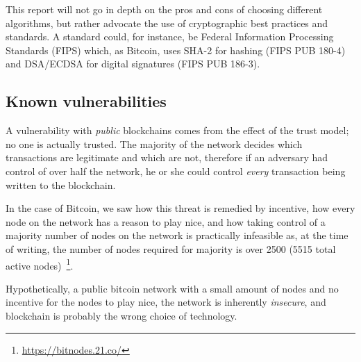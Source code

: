 This report will not go in depth on the pros and cons of choosing
different algorithms, but rather advocate the use of cryptographic
best practices and standards. A standard could, for instance, be
Federal Information Processing Standards (FIPS) which, as Bitcoin,
uses SHA-2 for hashing (FIPS PUB 180-4) and DSA/ECDSA for digital
signatures (FIPS PUB 186-3).


\subsection{Known vulnerabilities}
\label{sec:block-vuln}
A vulnerability with \textit{public} blockchains comes from the effect
of the trust model; no one is actually trusted. The majority of the
network decides which transactions are legitimate and which are not,
therefore if an adversary had control of over half the network, he or
she could control \textit{every} transaction being written to the
blockchain.

In the case of Bitcoin, we saw how this threat is remedied by
incentive, how every node on the network has a reason to play nice,
and how taking control of a majority number of nodes on the network is
practically infeasible as, at the time of writing, the number of nodes
required for majority is over 2500 (5515 total active
nodes)~\footnote{\url{https://bitnodes.21.co/}}.

Hypothetically, a public bitcoin network with a small amount of nodes
and no incentive for the nodes to play nice, the network is inherently
\textit{insecure}, and blockchain is probably the wrong choice of
technology.
